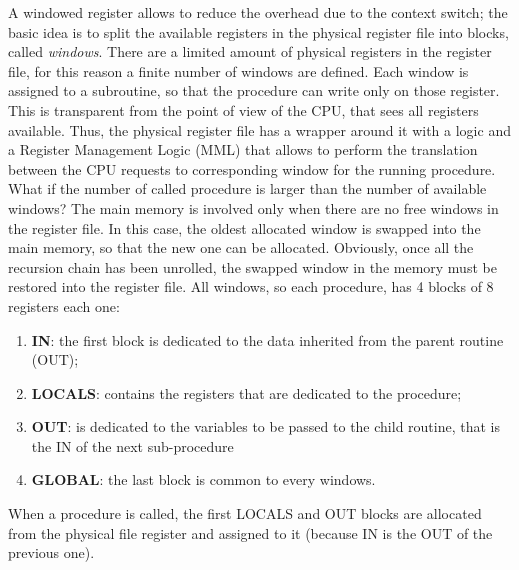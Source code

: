 A windowed register allows to reduce the overhead due to the context switch; the basic idea
is to split the available registers in the physical register file into blocks, called \textit{windows}. There are a limited amount of physical registers in the register file, for this reason a finite number of windows are defined. Each window is assigned to a subroutine, so that the procedure can write only on those register. This is transparent from the point of view of the CPU, that sees all registers available. Thus, the physical register file has a wrapper around it with a logic and a Register Management Logic (MML) that allows to perform the translation between the CPU requests to corresponding window for the running procedure.\newline\newline
What if the number of called procedure is larger than the number of available windows? The main
memory is involved only when there are no free windows in the register file. In this case, the oldest allocated window is swapped into the main memory, so that the new one can be allocated. Obviously, once all the recursion chain has been unrolled, the swapped window in the memory must be restored into the register file.
All windows, so each procedure, has 4 blocks of 8 registers each one:
\begin{enumerate}
	\itemsep0sp
	\item \textbf{IN}: the first block is dedicated to the data inherited from the parent routine (OUT);
	\item \textbf{LOCALS}: contains the registers that are dedicated to the procedure;
	\item \textbf{OUT}: is dedicated to the variables to be passed to the child routine, that is the IN of the next sub-procedure
	\item \textbf{GLOBAL}: the last block is common to every windows.
\end{enumerate}
When a procedure is called, the first LOCALS and OUT blocks are allocated from the physical file register and assigned to it (because IN is the OUT of the previous one).

